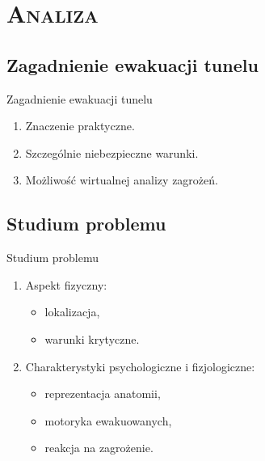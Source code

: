 \section{\scshape Analiza}


\subsection{Zagadnienie ewakuacji tunelu}
\begin{frame}{Zagadnienie ewakuacji tunelu}

\begin{enumerate}
  \item Znaczenie praktyczne.
  \item Szczególnie niebezpieczne warunki.
  \item Możliwość wirtualnej analizy zagrożeń.
\end{enumerate}

\end{frame}


\subsection{Studium problemu}
\begin{frame}{Studium problemu}

\begin{enumerate}
  \item Aspekt fizyczny:
  \begin{itemize}
    \item lokalizacja,
    \item warunki krytyczne.
  \end{itemize}
  \item Charakterystyki psychologiczne i fizjologiczne:
  \begin{itemize}
    \item reprezentacja anatomii,
    \item motoryka ewakuowanych,
    \item reakcja na zagrożenie.
  \end{itemize}
\end{enumerate}

\end{frame}